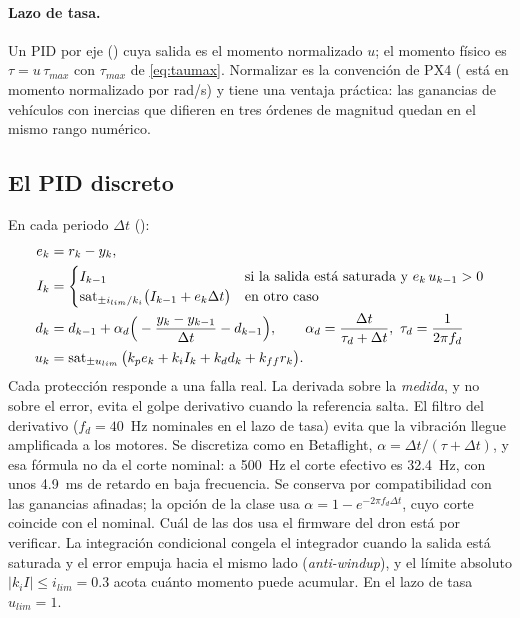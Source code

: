 \paragraph{Lazo de tasa.} Un PID por eje () cuya salida
es el momento normalizado $u$; el momento físico es
$\tau=u\,\tau_{max}$ con $\tau_{max}$ de \eqref{eq:taumax}. Normalizar es la
convención de PX4 ( está en momento normalizado por
rad/s) y tiene una ventaja práctica: las ganancias de vehículos con
inercias que difieren en tres órdenes de magnitud quedan en el mismo rango
numérico.

\subsection{El PID discreto}

En cada periodo $\Delta t$ ():
\begin{align}
e_k&=r_k-y_k,\nonumber\\
I_k&=\begin{cases}I_{k-1} & \text{si la salida está saturada y } e_k\,u_{k-1}>0\\
\sat_{\pm i_{lim}/k_i}\!\big(I_{k-1}+e_k\Delta t\big) & \text{en otro caso}\end{cases}\label{eq:pid}\\
d_k&=d_{k-1}+\alpha_d\Big(-\frac{y_k-y_{k-1}}{\Delta t}-d_{k-1}\Big),\qquad \alpha_d=\frac{\Delta t}{\tau_d+\Delta t},\ \tau_d=\frac{1}{2\pi f_d}\nonumber\\
u_k&=\sat_{\pm u_{lim}}\big(k_pe_k+k_iI_k+k_dd_k+k_{ff}r_k\big).\nonumber
\end{align}
Cada protección responde a una falla real. La derivada sobre la
\emph{medida}, y no sobre el error, evita el golpe derivativo cuando la
referencia salta. El filtro del derivativo ($f_d=40$~Hz nominales en el
lazo de tasa) evita que la vibración llegue amplificada a los motores. Se
discretiza como en Betaflight, $\alpha=\Delta t/(\tau+\Delta t)$, y esa
fórmula no da el corte nominal: a 500~Hz el corte efectivo es 32.4~Hz, con
unos 4.9~ms de retardo en baja frecuencia. Se conserva por compatibilidad con
las ganancias afinadas; la opción  de la clase  usa
$\alpha=1-e^{-2\pi f_d\Delta t}$, cuyo corte coincide con el nominal. Cuál de
las dos usa el firmware del dron está por verificar. La integración
condicional congela el integrador cuando la salida está saturada y el error
empuja hacia el mismo lado (\emph{anti-windup}), y el límite absoluto
$|k_iI|\le i_{lim}=0.3$ acota cuánto momento puede acumular. En el lazo de
tasa $u_{lim}=1$.

